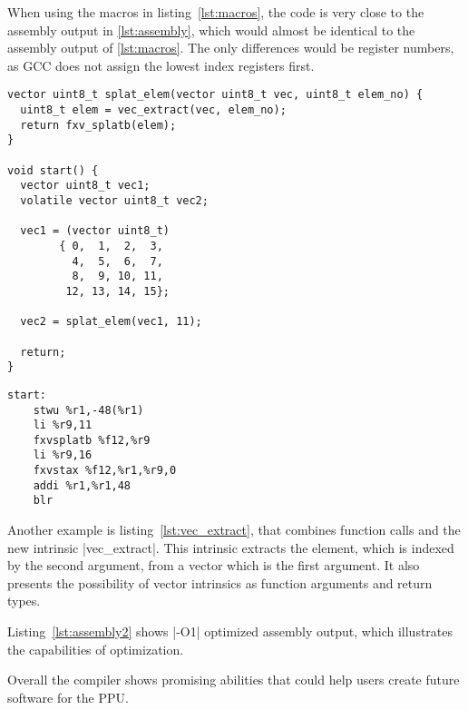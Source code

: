 When using the macros in listing~\ref{lst:macros}, the code is very close to the assembly output in \ref{lst:assembly}, which would almost be identical to the assembly output of \ref{lst:macros}.
The only differences would be register numbers, as \ac{GCC} does not assign the lowest index registers first.

\begin{adjustbox}{width=1.0\textwidth}
\lstset{numbers=none}
    \begin{minipage}[t]{.45\textwidth}
    \begin{lstlisting}[caption={Code Example with Function and Complex Intrinsic}, label=lst:vec_extract]
vector uint8_t splat_elem(vector uint8_t vec, uint8_t elem_no) {
  uint8_t elem = vec_extract(vec, elem_no);
  return fxv_splatb(elem);
}

void start() {
  vector uint8_t vec1;
  volatile vector uint8_t vec2;

  vec1 = (vector uint8_t)
        { 0,  1,  2,  3,
          4,  5,  6,  7,
          8,  9, 10, 11,
         12, 13, 14, 15};

  vec2 = splat_elem(vec1, 11);

  return;
} 
\end{lstlisting}
\end{minipage}
\hspace{1cm}
\begin{minipage}[t]{.45\textwidth}
    \begin{lstlisting}[caption={Optimized Assembly Output for \ref{lst:vec_extract}}, label=lst:assembly2]
start:
	stwu %r1,-48(%r1)
	li %r9,11
	fxvsplatb %f12,%r9
	li %r9,16
	fxvstax %f12,%r1,%r9,0
	addi %r1,%r1,48
	blr
\end{lstlisting}
\end{minipage}
\end{adjustbox}

Another example is listing~\ref{lst:vec_extract}, that combines function calls and the new intrinsic |vec_extract|.
This intrinsic extracts the element, which is indexed by the second argument, from a vector which is the first argument.
It also presents the possibility of vector intrinsics as function arguments and return types.

Listing~\ref{lst:assembly2} shows |-O1| optimized assembly output, which illustrates the capabilities of optimization.

Overall the compiler shows promising abilities that could help users create future software for the \ac{PPU}.

